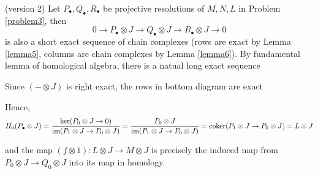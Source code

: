 \begin{longproof}
	(version 2) Let $P_\bullet, Q_\bullet, R_\bullet$ be projective resolutions of $M, N, L$ in Problem \ref{problem3}, then
	$$
		0 \to P_\bullet \otimes J \to Q_\bullet \otimes J \to R_\bullet \otimes J \to 0
	$$
	is also a short exact sequence of chain complexes (rows are exact by Lemma \ref{lemma5}, columns are chain complexes by Lemma \ref{lemma6}). By fundamental lemma of homological algebra, there is a natual long exact sequence
	\begin{center}
	\end{center}
	
	Since $(- \otimes J)$ is right exact, the rows in bottom diagram are exact
	\begin{center}
	\end{center}
	
	Hence, 
	$$
		H_0(P_\bullet \otimes J) = \frac{\ker (P_0 \otimes J \to 0)}{\operatorname{im} (P_1 \otimes J \to P_0 \otimes J)} = \frac{P_0 \otimes J}{\operatorname{im} (P_1 \otimes J \to P_0 \otimes J)} = \operatorname{coker} (P_1 \otimes J \to P_0 \otimes J) = L \otimes J
	$$
	
	and the map $(f \otimes 1): L \otimes J \to M \otimes J$ is precisely the induced map from $P_0 \otimes J \to Q_0 \otimes J$ into its map in homology.
\end{longproof}

